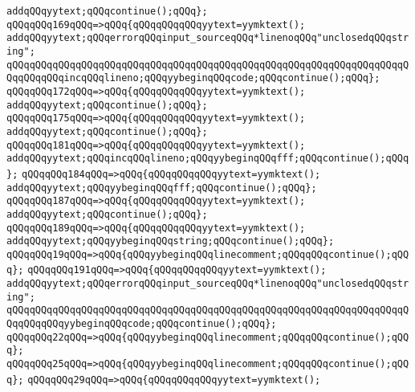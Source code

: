\verb|addqQQqyytext;qQQqcontinue();qQQq};|\newline
\verb|qQQqqQQq169qQQq=>qQQq{qQQqqQQqqQQqyytext=yymktext();|\newline
\verb|addqQQqyytext;qQQqerrorqQQqinput_sourceqQQq*linenoqQQq"unclosedqQQqstring";|\newline
\verb|qQQqqQQqqQQqqQQqqQQqqQQqqQQqqQQqqQQqqQQqqQQqqQQqqQQqqQQqqQQqqQQqqQQqqQQqqQQqqQQqincqQQqlineno;qQQqyybeginqQQqcode;qQQqcontinue();qQQq};|\newline
\verb|qQQqqQQq172qQQq=>qQQq{qQQqqQQqqQQqyytext=yymktext();|\newline
\verb|addqQQqyytext;qQQqcontinue();qQQq};|\newline
\verb|qQQqqQQq175qQQq=>qQQq{qQQqqQQqqQQqyytext=yymktext();|\newline
\verb|addqQQqyytext;qQQqcontinue();qQQq};|\newline
\verb|qQQqqQQq181qQQq=>qQQq{qQQqqQQqqQQqyytext=yymktext();|\newline
\verb|addqQQqyytext;qQQqincqQQqlineno;qQQqyybeginqQQqfff;qQQqcontinue();qQQq};|\newline
\verb|qQQqqQQq184qQQq=>qQQq{qQQqqQQqqQQqyytext=yymktext();|\newline
\verb|addqQQqyytext;qQQqyybeginqQQqfff;qQQqcontinue();qQQq};|\newline
\verb|qQQqqQQq187qQQq=>qQQq{qQQqqQQqqQQqyytext=yymktext();|\newline
\verb|addqQQqyytext;qQQqcontinue();qQQq};|\newline
\verb|qQQqqQQq189qQQq=>qQQq{qQQqqQQqqQQqyytext=yymktext();|\newline
\verb|addqQQqyytext;qQQqyybeginqQQqstring;qQQqcontinue();qQQq};|\newline
\verb|qQQqqQQq19qQQq=>qQQq{qQQqyybeginqQQqlinecomment;qQQqqQQqcontinue();qQQq};|\newline
\verb|qQQqqQQq191qQQq=>qQQq{qQQqqQQqqQQqyytext=yymktext();|\newline
\verb|addqQQqyytext;qQQqerrorqQQqinput_sourceqQQq*linenoqQQq"unclosedqQQqstring";|\newline
\verb|qQQqqQQqqQQqqQQqqQQqqQQqqQQqqQQqqQQqqQQqqQQqqQQqqQQqqQQqqQQqqQQqqQQqqQQqqQQqqQQqyybeginqQQqcode;qQQqcontinue();qQQq};|\newline
\verb|qQQqqQQq22qQQq=>qQQq{qQQqyybeginqQQqlinecomment;qQQqqQQqcontinue();qQQq};|\newline
\verb|qQQqqQQq25qQQq=>qQQq{qQQqyybeginqQQqlinecomment;qQQqqQQqcontinue();qQQq};|\newline
\verb|qQQqqQQq29qQQq=>qQQq{qQQqqQQqqQQqyytext=yymktext();|\newline
